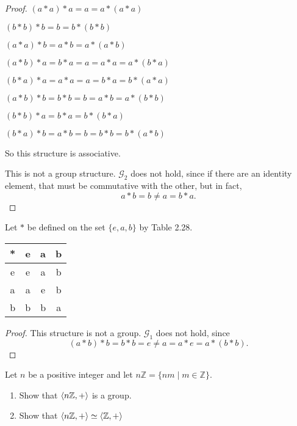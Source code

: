 \begin{proof}
    $(a * a) * a = a = a * (a * a)$

    $(b * b) * b = b = b * (b * b)$

    $(a * a) * b = a * b = a * (a * b)$

    $(a * b) * a = b * a = a = a * a = a * (b * a)$

    $(b * a) * a = a * a = a = b * a = b * (a * a)$

    $(a * b) * b = b * b = b = a * b = a * (b * b)$

    $(b * b) * a = b * a = b * (b * a)$

    $(b * a) * b = a * b = b = b * b = b * (a * b)$

    So this structure is associative.

    This is not a group structure. $\mathcal{G}_{2}$ does not hold, since if there are an identity element, that must be commutative with the other, but in fact,
    \[
        a * b = b \ne a = b * a.
    \]
\end{proof}

\newpage
\begin{exercise}
    Let $*$ be defined on the set $\{ e, a, b \}$ by Table 2.28.
    \begin{tabular}{c|ccc}
        * & e & a & b \\
        \hline
        e & e & a & b \\
        a & a & e & b \\
        b & b & b & a
    \end{tabular}
\end{exercise}

\begin{proof}
    This structure is not a group. $\mathcal{G}_{1}$ does not hold, since
    \[
        (a * b) * b = b * b = e \ne a = a * e = a * (b * b).
    \]
\end{proof}

\newpage
\begin{exercise}
    Let $n$ be a positive integer and let $n\mathbb{Z} = \{ nm \mid m\in\mathbb{Z} \}$.
    \begin{enumerate}[label={\textbf{\alph*.}}]
        \item Show that $\left\langle{n\mathbb{Z}, +}\right\rangle$ is a group.
        \item Show that $\left\langle{n\mathbb{Z}, +}\right\rangle \simeq \left\langle{\mathbb{Z}, +}\right\rangle$
    \end{enumerate}
\end{exercise}

